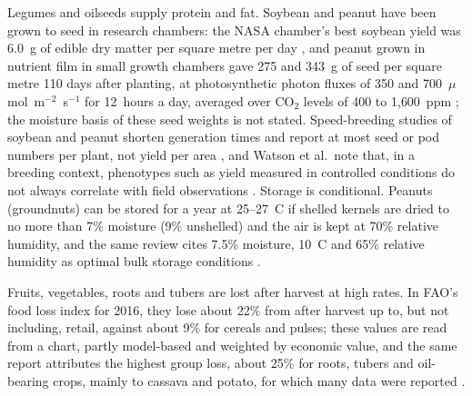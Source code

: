Legumes and oilseeds supply protein and fat. Soybean and peanut have been grown to seed in research chambers: the NASA chamber's best soybean yield was 6.0~g of edible dry matter per square metre per day \cite[p.~708; Table~2, p.~711]{wheeler2008crop}, and peanut grown in nutrient film in small growth chambers gave 275 and 343~g of seed per square metre 110 days after planting, at photosynthetic photon fluxes of 350 and 700~$\mu$mol~m$^{-2}$~s$^{-1}$ for 12~hours a day, averaged over CO$_2$ levels of 400 to 1{,}600~ppm \cite[p.~328; Table~2, p.~333]{mortley2001peanut}; the moisture basis of these seed weights is not stated. Speed-breeding studies of soybean and peanut shorten generation times and report at most seed or pod numbers per plant, not yield per area \cite[Abstract; p.~6]{jahne2020speed}\cite[Abstract, p.~107; Table~1, p.~110]{oconnor2013peanut}, and Watson et al.\ note that, in a breeding context, phenotypes such as yield measured in controlled conditions do not always correlate with field observations \cite[p.~26]{watson2018speed}. Storage is conditional. Peanuts (groundnuts) can be stored for a year at 25--27~\textdegree{}C if shelled kernels are dried to no more than 7\% moisture (9\% unshelled) and the air is kept at 70\% relative humidity, and the same review cites 7.5\% moisture, 10~\textdegree{}C and 65\% relative humidity as optimal bulk storage conditions \cite[Section~4]{waliyar2015aflatoxin}.%


Fruits, vegetables, roots and tubers are lost after harvest at high rates. In FAO's food loss index for 2016, they lose about 22\% from after harvest up to, but not including, retail, against about 9\% for cereals and pulses; these values are read from a chart, partly model-based and weighted by economic value, and the same report attributes the highest group loss, about 25\% for roots, tubers and oil-bearing crops, mainly to cassava and potato, for which many data were reported \cite[Fig.~4, p.~9]{fao2019sofa}.


